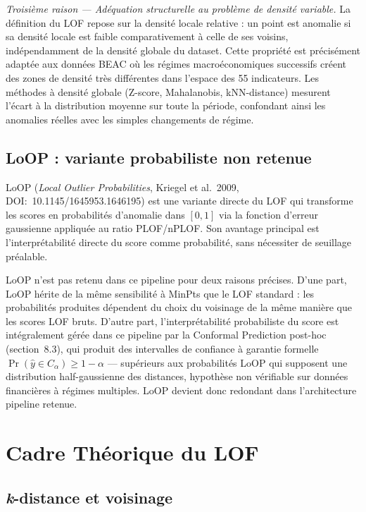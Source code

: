 \documentclass[12pt,a4paper]{article}
\begin{document}
\textit{Troisième raison --- Adéquation structurelle au problème de densité
variable.} La définition du LOF repose sur la densité locale relative : un
point est anomalie si sa densité locale est faible comparativement à celle
de ses voisins, indépendamment de la densité globale du dataset. Cette
propriété est précisément adaptée aux données BEAC où les régimes
macroéconomiques successifs créent des zones de densité très différentes dans
l'espace des 55 indicateurs. Les méthodes à densité globale (Z-score,
Mahalanobis, kNN-distance) mesurent l'écart à la distribution moyenne sur
toute la période, confondant ainsi les anomalies réelles avec les simples
changements de régime.

\subsection{LoOP : variante probabiliste non retenue}
\label{subsec:loop}

LoOP (\textit{Local Outlier Probabilities}, Kriegel et al.\ 2009,
DOI:~10.1145/1645953.1646195) est une variante directe du LOF qui transforme
les scores en probabilités d'anomalie dans $[0,1]$ via la fonction d'erreur
gaussienne appliquée au ratio PLOF/nPLOF. Son avantage principal est
l'interprétabilité directe du score comme probabilité, sans nécessiter de
seuillage préalable.

LoOP n'est pas retenu dans ce pipeline pour deux raisons précises. D'une part,
LoOP hérite de la même sensibilité à MinPts que le LOF standard : les
probabilités produites dépendent du choix du voisinage de la même manière que
les scores LOF bruts. D'autre part, l'interprétabilité probabiliste du score
est intégralement gérée dans ce pipeline par la Conformal Prediction post-hoc
(section~8.3), qui produit des intervalles de confiance à garantie formelle
$\Pr(\hat{y} \in C_\alpha) \geq 1 - \alpha$ --- supérieurs aux probabilités
LoOP qui supposent une distribution half-gaussienne des distances, hypothèse
non vérifiable sur données financières à régimes multiples. LoOP devient donc
redondant dans l'architecture pipeline retenue.
\section{Cadre Théorique du LOF}

\subsection{\textit{k}-distance et voisinage}
\end{document}
